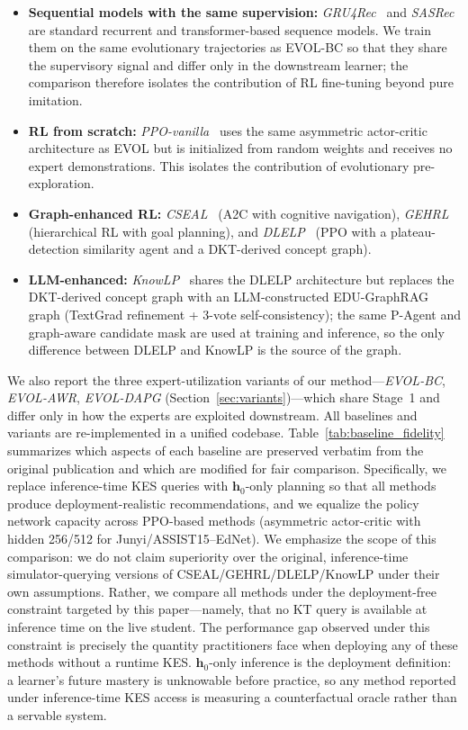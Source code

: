 \documentclass[sigconf,anonymous]{acmart}
\newcommand{\ours}{\textrm{EVOL}}
\begin{document}
\begin{itemize}
    \item \textbf{Sequential models with the same supervision:} \textit{GRU4Rec}~\cite{hidasi2016gru4rec} and \textit{SASRec}~\cite{kang2018sasrec} are standard recurrent and transformer-based sequence models. We train them on the same evolutionary trajectories as \ours{}-BC so that they share the supervisory signal and differ only in the downstream learner; the comparison therefore isolates the contribution of RL fine-tuning beyond pure imitation.
    \item \textbf{RL from scratch:} \textit{PPO-vanilla}~\cite{schulman2017ppo} uses the same asymmetric actor-critic architecture as \ours{} but is initialized from random weights and receives no expert demonstrations. This isolates the contribution of evolutionary pre-exploration.
    \item \textbf{Graph-enhanced RL:} \textit{CSEAL}~\cite{liu2019cseal} (A2C with cognitive navigation), \textit{GEHRL}~\cite{li2023gehrl} (hierarchical RL with goal planning), and \textit{DLELP}~\cite{cheng2025knowlp} (PPO with a plateau-detection similarity agent and a DKT-derived concept graph).
    \item \textbf{LLM-enhanced:} \textit{KnowLP}~\cite{cheng2025knowlp} shares the DLELP architecture but replaces the DKT-derived concept graph with an LLM-constructed EDU-GraphRAG graph (TextGrad refinement + 3-vote self-consistency); the same P-Agent and graph-aware candidate mask are used at training and inference, so the only difference between DLELP and KnowLP is the source of the graph.
\end{itemize}

We also report the three expert-utilization variants of our method---\textit{\ours{}-BC}, \textit{\ours{}-AWR}, \textit{\ours{}-DAPG} (Section~\ref{sec:variants})---which share Stage~1 and differ only in how the experts are exploited downstream. All baselines and variants are re-implemented in a unified codebase. Table~\ref{tab:baseline_fidelity} summarizes which aspects of each baseline are preserved verbatim from the original publication and which are modified for fair comparison. Specifically, we replace inference-time KES queries with $\mathbf{h}_0$-only planning so that all methods produce deployment-realistic recommendations, and we equalize the policy network capacity across PPO-based methods (asymmetric actor-critic with hidden 256/512 for Junyi/ASSIST15--EdNet). We emphasize the scope of this comparison: we do not claim superiority over the original, inference-time simulator-querying versions of CSEAL/GEHRL/DLELP/KnowLP under their own assumptions. Rather, we compare all methods under the deployment-free constraint targeted by this paper---namely, that no KT query is available at inference time on the live student. The performance gap observed under this constraint is precisely the quantity practitioners face when deploying any of these methods without a runtime KES. $\mathbf{h}_0$-only inference is the deployment definition: a learner's future mastery is unknowable before practice, so any method reported under inference-time KES access is measuring a counterfactual oracle rather than a servable system.
\end{document}
